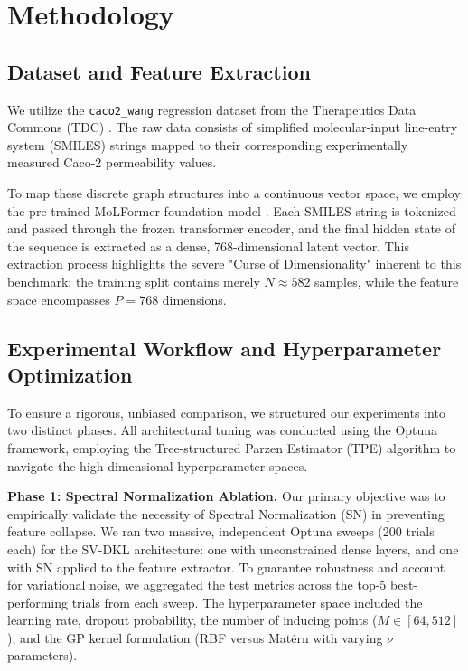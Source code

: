 \section{Methodology}

\subsection{Dataset and Feature Extraction}
We utilize the \texttt{caco2\_wang} regression dataset from the Therapeutics Data Commons (TDC) \cite{huang2021therapeutics}. The raw data consists of simplified molecular-input line-entry system (SMILES) strings mapped to their corresponding experimentally measured Caco-2 permeability values. 

To map these discrete graph structures into a continuous vector space, we employ the pre-trained MoLFormer foundation model \cite{ross2022large}. Each SMILES string is tokenized and passed through the frozen transformer encoder, and the final hidden state of the sequence is extracted as a dense, 768-dimensional latent vector. This extraction process highlights the severe "Curse of Dimensionality" inherent to this benchmark: the training split contains merely $N \approx 582$ samples, while the feature space encompasses $P = 768$ dimensions.

\subsection{Experimental Workflow and Hyperparameter Optimization}
To ensure a rigorous, unbiased comparison, we structured our experiments into two distinct phases. All architectural tuning was conducted using the Optuna framework, employing the Tree-structured Parzen Estimator (TPE) algorithm to navigate the high-dimensional hyperparameter spaces.

\textbf{Phase 1: Spectral Normalization Ablation.} Our primary objective was to empirically validate the necessity of Spectral Normalization (SN) in preventing feature collapse. We ran two massive, independent Optuna sweeps (200 trials each) for the SV-DKL architecture: one with unconstrained dense layers, and one with SN applied to the feature extractor. To guarantee robustness and account for variational noise, we aggregated the test metrics across the top-5 best-performing trials from each sweep. The hyperparameter space included the learning rate, dropout probability, the number of inducing points ($M \in [64, 512]$), and the GP kernel formulation (RBF versus Matérn with varying $\nu$ parameters). 

